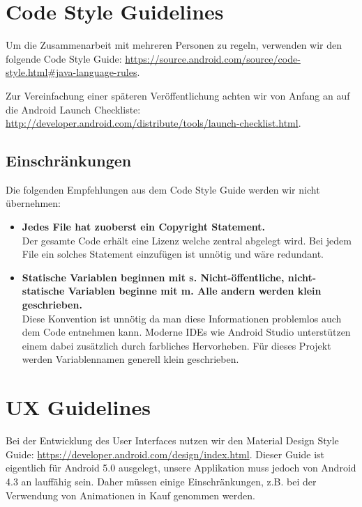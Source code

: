 \section{Code Style Guidelines}
\label{sec:Code Style Guidelines}

Um die Zusammenarbeit mit mehreren Personen zu regeln, verwenden wir den folgende Code Style Guide: \url{https://source.android.com/source/code-style.html#java-language-rules}.

Zur Vereinfachung einer späteren Veröffentlichung achten wir von Anfang an auf die Android Launch Checkliste:\\ \url{http://developer.android.com/distribute/tools/launch-checklist.html}.

\subsection{Einschränkungen}
Die folgenden Empfehlungen aus dem Code Style Guide werden wir nicht übernehmen:

\begin{itemize}
\item \textbf{Jedes File hat zuoberst ein Copyright Statement.} \\ Der gesamte Code erhält eine Lizenz welche zentral abgelegt wird. Bei jedem File ein solches Statement einzufügen ist unnötig und wäre redundant.
\item \textbf{Statische Variablen beginnen mit s. Nicht-öffentliche, nicht-statische Variablen beginne mit m. Alle andern werden klein geschrieben.} \\ Diese Konvention ist unnötig da man diese Informationen problemlos auch dem Code entnehmen kann. Moderne IDEs wie Android Studio unterstützen einem dabei zusätzlich durch farbliches Hervorheben. Für dieses Projekt werden Variablennamen generell klein geschrieben.
\end{itemize}

\section{UX Guidelines}
\label{sec:UX Guidelines}

Bei der Entwicklung des User Interfaces nutzen wir den Material Design Style Guide:
\url{https://developer.android.com/design/index.html}. Dieser Guide ist eigentlich für Android 5.0 ausgelegt, unsere Applikation muss jedoch von Android 4.3 an lauffähig sein. Daher müssen einige Einschränkungen, z.B. bei der Verwendung von Animationen in Kauf genommen werden.
